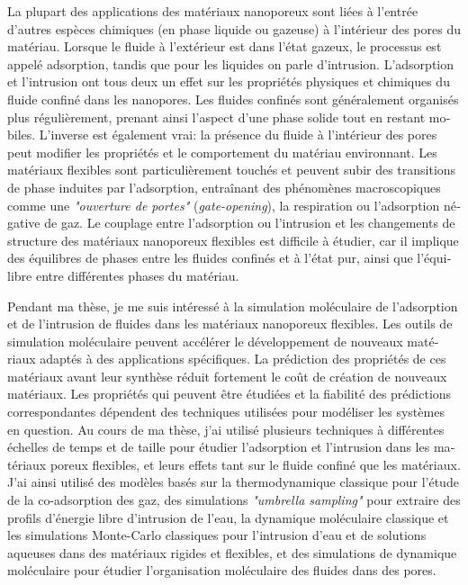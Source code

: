\documentclass[thesis]{subfiles}
\begin{document}
\begin{otherlanguage}{french}
La plupart des applications des matériaux nanoporeux sont liées à l'entrée
d'autres espèces chimiques (en phase liquide ou gazeuse) à l'intérieur des pores
du matériau. Lorsque le fluide à l'extérieur est dans l'état gazeux, le
processus est appelé adsorption, tandis que pour les liquides on parle
d'intrusion. L'adsorption et l'intrusion ont tous deux un effet sur les
propriétés physiques et chimiques du fluide confiné dans les nanopores. Les
fluides confinés sont généralement organisés plus régulièrement, prenant ainsi
l'aspect d'une phase solide tout en restant mobiles. L'inverse est également
vrai: la présence du fluide à l'intérieur des pores peut modifier les propriétés
et le comportement du matériau environnant. Les matériaux flexibles sont
particulièrement touchés et peuvent subir des transitions de phase induites par
l'adsorption, entraînant des phénomènes macroscopiques comme une
\emph{"ouverture de portes"} (\emph{gate-opening}), la respiration ou
l'adsorption négative de gaz. Le couplage entre l'adsorption ou l'intrusion et
les changements de structure des matériaux nanoporeux flexibles est difficile à
étudier, car il implique des équilibres de phases entre les fluides confinés et
à l'état pur, ainsi que l'équilibre entre différentes phases du matériau.

Pendant ma thèse, je me suis intéressé à la simulation moléculaire de
l'adsorption et de l'intrusion de fluides dans les matériaux nanoporeux
flexibles. Les outils de simulation moléculaire peuvent accélérer le
développement de nouveaux matériaux adaptés à des applications spécifiques. La
prédiction des propriétés de ces matériaux avant leur synthèse réduit fortement
le coût de création de nouveaux matériaux. Les propriétés qui peuvent être
étudiées et la fiabilité des prédictions correspondantes dépendent des
techniques utilisées pour modéliser les systèmes en question. Au cours de ma
thèse, j'ai utilisé plusieurs techniques à différentes échelles de temps et de
taille pour étudier l'adsorption et l'intrusion dans les matériaux poreux
flexibles, et leurs effets tant sur le fluide confiné que les matériaux. J'ai
ainsi utilisé des modèles basés sur la thermodynamique classique pour l'étude de
la co-adsorption des gaz, des simulations \emph{"umbrella sampling"} pour
extraire des profils d'énergie libre d'intrusion de l'eau, la dynamique
moléculaire classique et les simulations Monte-Carlo classiques pour l'intrusion
d'eau et de solutions aqueuses dans des matériaux rigides et flexibles, et des
simulations de dynamique moléculaire \abinitio pour étudier l'organisation
moléculaire des fluides dans des pores.


\end{otherlanguage}
\end{document}
